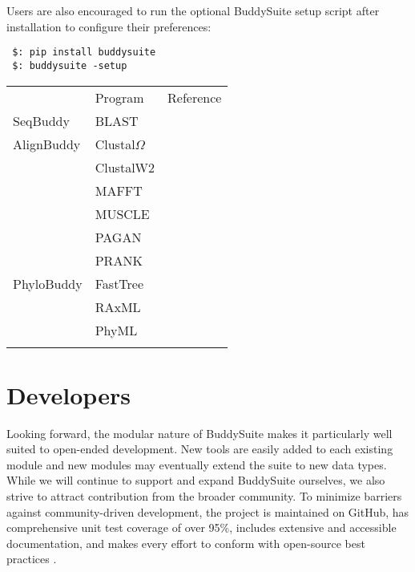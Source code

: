 \documentclass[nogrid]{MBE_article}%
\begin{document}
Users are also encouraged to run the optional BuddySuite setup script after installation to configure their preferences:

\smallskip
{\small
\begin{verbatim}
 $: pip install buddysuite
 $: buddysuite -setup
\end{verbatim}
}
\smallskip


\begin{table}[!t]
      {\tabcolsep=5pt\begin{tabular}{@{\extracolsep{\fill}}lll@{}}
      \toprule
	   						& Program								& Reference
      \\\colrule
      SeqBuddy				& BLAST 								& \cite{Camacho2009}
      \\\colrule
      AlignBuddy			& Clustal$\Omega$						& \cite{Sievers:2011fn} \\
        					& ClustalW2 							& \cite{Larkin:2007hz} \\
							& MAFFT 								& \cite{Katoh:2013hm} \\
							& MUSCLE 								& \cite{Edgar:2004bo} \\
							& PAGAN 								& \cite{Loytynoja:2012fy} \\
        					& PRANK 								& \cite{Loytynoja:2005cb}		
      \\\colrule
      PhyloBuddy			& FastTree								& \cite{Price:2010eg} \\
        					& RAxML 								& \cite{Stamatakis:2006de} \\
        					& PhyML 								& \cite{Guindon:2010gf}
      \\\botrule
      \end{tabular}}
{}
\end{table}

\section{Developers}
Looking forward, the modular nature of BuddySuite makes it particularly well suited to open-ended development. New tools are easily added to each existing module and new modules may eventually extend the suite to new data types. While we will continue to support and expand BuddySuite ourselves, we also strive to attract contribution from the broader community. To minimize barriers against community-driven development, the project is maintained on GitHub, has comprehensive unit test coverage of over 95\%, includes extensive and accessible documentation, and makes every effort to conform with open-source best practices \cite{Leprevost:2014gx,Seemann:2013ci}.
\end{document}
